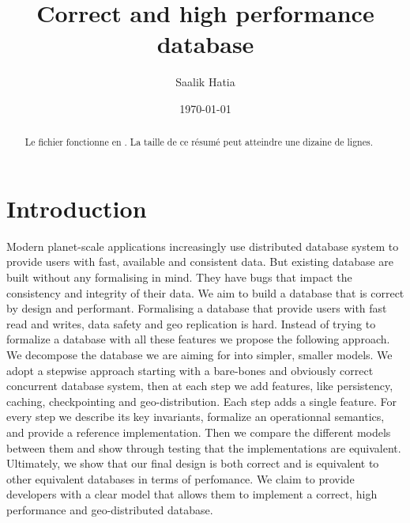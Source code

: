 \documentclass[systeme]{compas2022}
\begin{document}
\title{Correct and high performance database}

\author{Saalik Hatia}%

\address{Université Pierre et Marie Curie\\
Laboratoire LIP6 \\
4, place jussieu\\
75005 Paris - France\\
saalik.hatia@lip6.fr}

\date{\today}

\maketitle

\begin{abstract}
  Le fichier fonctionne en \LaTeXe. La taille
  de ce résumé peut atteindre une dizaine de lignes.
\end{abstract}

\tableofcontents

\section{Introduction}

Modern planet-scale applications increasingly use distributed database system to provide users with fast, available and consistent data.
But existing database are built without any formalising in mind.
They have bugs that impact the consistency and integrity of their data.
We aim to build a database that is correct by design and performant.
Formalising a database that provide users with fast read and writes, data safety and geo replication is hard.
Instead of trying to formalize a database with all these features we propose the following approach.
We decompose the database we are aiming for into simpler, smaller models.
We adopt a stepwise approach starting with a bare-bones and obviously correct concurrent database system, then at each step we add features, like persistency, caching, checkpointing and geo-distribution. 
Each step adds a single feature.
For every step we describe its key invariants, formalize an operationnal semantics, and provide a reference implementation.
Then we compare the different models between them and show through testing that the implementations are equivalent.
Ultimately, we show that our final design is both correct and is equivalent to other equivalent databases in terms of perfomance.
We claim to provide developers with a clear model that allows them to implement a correct, high performance and geo-distributed database.
\end{document}
